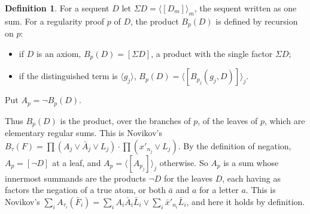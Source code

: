 \documentclass[11pt]{amsart}
\theoremstyle{definition}
\newtheorem{definition}[theorem]{Definition}
\theoremstyle{remark}
\newcommand{\seq}[1]{\langle #1\rangle}
\newcommand{\one}[1]{[#1]}
\begin{document}
\begin{definition}
  For a sequent $D$ let $\Sigma D=\seq{\one{D_m}}_m$, the sequent written
  as one sum. For a regularity proof $p$ of $D$, the product $B_p(D)$ is
  defined by recursion on $p$:
  \begin{itemize}
  \item if $D$ is an axiom, $B_p(D)=\one{\Sigma D}$, a product with the
    single factor $\Sigma D$;
  \item if the distinguished term is $\seq{g_j}$,
    $B_p(D)=\seq{\one{B_{p_j}(g_j,D)}}_j$.
  \end{itemize}
  Put $A_p=\neg B_p(D)$.
\end{definition}

Thus $B_p(D)$ is the product, over the branches of $p$, of the leaves of
$p$, which are elementary regular sums. This is Novikov's
$B_\tau(F)=\prod(A_j\vee\bar A_j\vee L_j)\cdot\prod(x'_{n_j}\vee L_j)$.
By the definition of negation, $A_p=\one{\neg D}$ at a leaf, and
$A_p=\seq{\one{A_{p_j}}}_j$ otherwise. So $A_p$ is a sum whose innermost
summands are the products $\neg D$ for the leaves $D$, each having as
factors the negation of a true atom, or both $\bar a$ and $a$ for a letter
$a$. This is Novikov's
$\sum_iA_{\tau_i}(\bar F_i)=\sum_i A_i\bar A_i\bar L_i\vee\sum_i
\bar x'_{n_i}\bar L_i$, and here it holds by definition.
\end{document}

